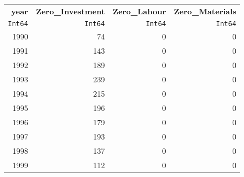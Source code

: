 \begin{tabular}{rrrr}
  \hline
  \textbf{year} & \textbf{Zero\_Investment} & \textbf{Zero\_Labour} & \textbf{Zero\_Materials} \\
  \texttt{Int64} & \texttt{Int64} & \texttt{Int64} & \texttt{Int64} \\\hline
  1990 & 74 & 0 & 0 \\
  1991 & 143 & 0 & 0 \\
  1992 & 189 & 0 & 0 \\
  1993 & 239 & 0 & 0 \\
  1994 & 215 & 0 & 0 \\
  1995 & 196 & 0 & 0 \\
  1996 & 179 & 0 & 0 \\
  1997 & 193 & 0 & 0 \\
  1998 & 137 & 0 & 0 \\
  1999 & 112 & 0 & 0 \\\hline
\end{tabular}
